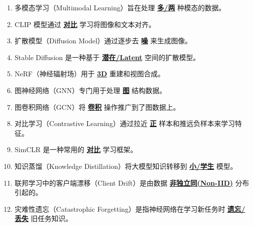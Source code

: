\documentclass[12pt,a4paper,openany]{ctexbook}
\begin{document}
\begin{enumerate}[resume,leftmargin=2em,itemsep=1pt]
\item 多模态学习（Multimodal Learning）旨在处理 \underline{\textbf{多/两}} 种模态的数据。
\item CLIP 模型通过 \underline{\textbf{对比}} 学习将图像和文本对齐。
\item 扩散模型（Diffusion Model）通过逐步去 \underline{\textbf{噪}} 来生成图像。
\item Stable Diffusion 是一种基于 \underline{\textbf{潜在/Latent}} 空间的扩散模型。
\item NeRF（神经辐射场）用于 \underline{\textbf{3D}} 重建和视图合成。
\item 图神经网络（GNN）专门用于处理 \underline{\textbf{图}} 结构数据。
\item 图卷积网络（GCN）将 \underline{\textbf{卷积}} 操作推广到了图数据上。
\item 对比学习（Contrastive Learning）通过拉近 \underline{\textbf{正}} 样本和推远负样本来学习特征。
\item SimCLR 是一种常用的 \underline{\textbf{对比}} 学习框架。
\item 知识蒸馏（Knowledge Distillation）将大模型知识转移到 \underline{\textbf{小/学生}} 模型。
\item 联邦学习中的客户端漂移（Client Drift）是由数据 \underline{\textbf{非独立同(Non-IID)}} 分布引起的。
\item 灾难性遗忘（Catastrophic Forgetting）是指神经网络在学习新任务时 \underline{\textbf{遗忘/丢失}} 旧任务知识。
\end{enumerate}
\end{document}
